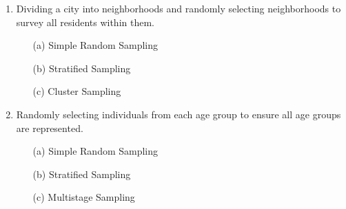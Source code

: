 \documentclass{article}
\begin{document}
\begin{enumerate}
    \item Dividing a city into neighborhoods and randomly selecting neighborhoods to survey all residents within them.
    \begin{itemize}
        \item[(a)] Simple Random Sampling
        \item[(b)] Stratified Sampling
        \item[(c)] Cluster Sampling
    \end{itemize}

    \item Randomly selecting individuals from each age group to ensure all age groups are represented.
    \begin{itemize}
        \item[(a)] Simple Random Sampling
        \item[(b)] Stratified Sampling
        \item[(c)] Multistage Sampling
    \end{itemize}
\end{enumerate}
\end{document}
